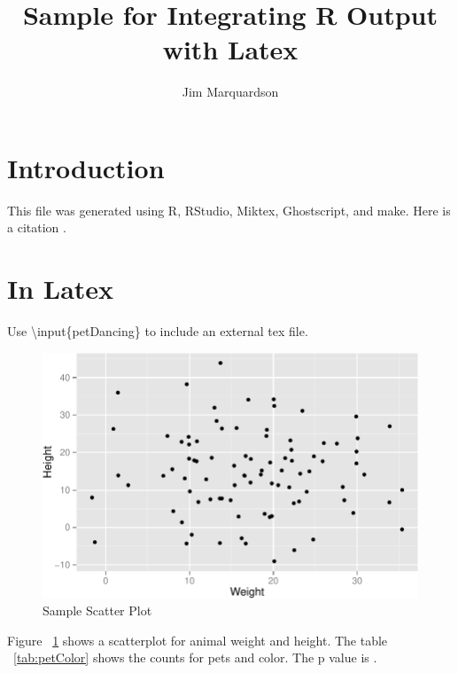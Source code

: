 \documentclass[letterpaper,twoside,10pt]{article}
\begin{document}
\pagestyle{empty} %

\title{Sample for Integrating R Output with Latex}
\author{Jim Marquardson}
\maketitle

\pagestyle{plain} %

\section{Introduction}\label{Introduction}

This file was generated using R, RStudio, Miktex, Ghostscript, and make. Here is a citation \cite{IsaacNewton}.

\section{In Latex}\label{InLatex}

Use \textbackslash{}input\{petDancing\} to include an external tex file.

\begin{figure}[htb]
  \centering
		\includegraphics{../figures/scatter.pdf}
	\caption{Sample Scatter Plot}
	\label{fig:scatter}
\end{figure}

Figure ~\ref{fig:scatter} shows a scatterplot for animal weight and height. The table ~\ref{tab:petColor} shows the counts for pets and color. The p value is \unskip.


\end{document}
